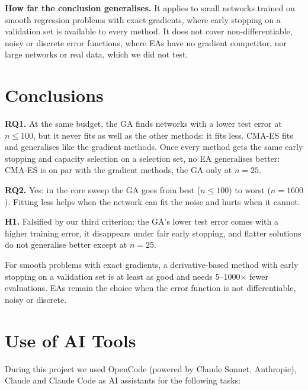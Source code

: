 \documentclass[11pt,a4paper]{article}
\newcommand{\cmaes}{CMA-ES}
\begin{document}
\textbf{How far the conclusion generalises.} It applies to small networks trained on smooth regression
problems with exact gradients, where early stopping on a validation set is available to every method. It does
not cover non-differentiable, noisy or discrete error functions, where EAs have no gradient competitor, nor
large networks or real data, which we did not test.

\section{Conclusions}

\textbf{RQ1.} At the same budget, the GA finds networks with a lower test error at $n\le100$, but it
never fits as well as the other methods: it fits less. \cmaes{} fits and generalises like the gradient
methods. Once every method gets the same early stopping and capacity selection on a selection set,
no EA generalises better: \cmaes{} is on par with the gradient methods, the GA only at $n=25$.

\textbf{RQ2.} Yes: in the core sweep the GA goes from best ($n\le100$) to worst ($n=1600$). Fitting
less helps when the network can fit the noise and hurts when it cannot.

\textbf{H1.} Falsified by our third criterion: the GA's lower test error comes with a higher training
error, it disappears under fair early stopping, and flatter solutions do not generalise better except
at $n=25$.

For smooth problems with exact gradients, a derivative-based method with early stopping on a
validation set is at least as good and needs 5--1000$\times$ fewer evaluations. EAs remain the
choice when the error function is not differentiable, noisy or discrete.

\section*{Use of AI Tools}

During this project we used OpenCode \citep{opencode2026} (powered by Claude Sonnet, Anthropic), Claude
\citep{anthropic2026claude} and Claude Code \citep{anthropic2026claudecode} as AI assistants for the following tasks:
\end{document}
